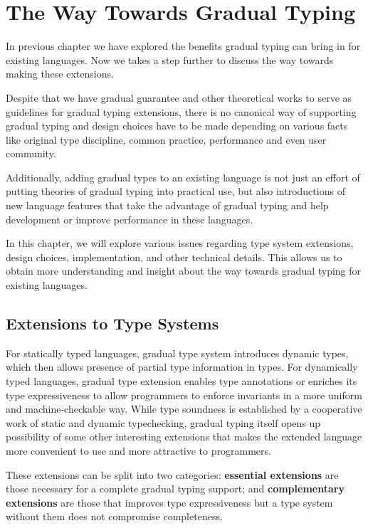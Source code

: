 
\section{The Way Towards Gradual Typing}


In previous chapter we have explored the benefits gradual typing
can bring in for existing languages.
Now we takes a step further to discuss the way towards making these extensions.

Despite that we have gradual guarantee\cite{siek2015refined} and other
theoretical works to serve as guidelines for gradual typing extensions,
there is no canonical way of supporting gradual typing
and design choices have to be made
depending on various facts like original type discipline, common practice, performance and even user community.

Additionally, adding gradual types to an existing language
is not just an effort of putting theories of gradual typing into practical use,
but also introductions of new language features
that take the advantage of gradual typing
and help development or improve performance in these languages.

In this chapter, we will explore various issues regarding
type system extensions, design choices,
implementation, and other technical details.
This allows us to obtain more understanding and insight about the way towards gradual typing for existing languages.

\subsection{Extensions to Type Systems}

For statically typed languages, gradual type system introduces
dynamic types, which then allows presence of partial type information
in types.
For dynamically typed languages, gradual type extension
enables type annotations or enriches its type expressiveness
to allow programmers to enforce invariants in a more uniform and
machine-checkable way.
While type soundness is established by a cooperative work
of static and dynamic typechecking,
gradual typing itself opens up possibility of some other interesting extensions
that makes the extended language more convenient to use and more attractive to programmers.

These extensions can be split into two categories:
\textbf{essential extensions} are those necessary
for a complete gradual typing support;
and \textbf{complementary extensions} are those that improves type expressiveness
but a type system without them does not compromise completeness.

